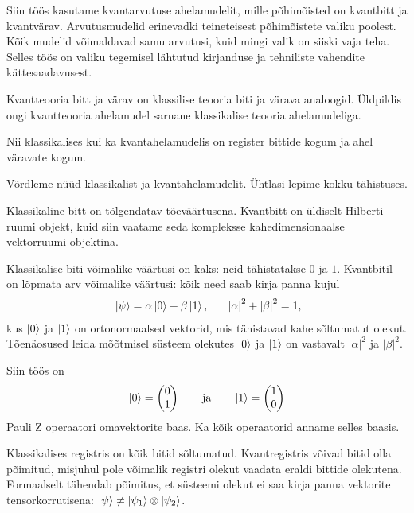 \documentclass[12pt]{report}
\def\abs#1{\left|#1\right|}
\def\ket#1{\mathinner{|#1\rangle}}
\begin{document}
Siin töös kasutame kvantarvutuse ahelamudelit, mille põhimõisted on kvantbitt
ja kvantvärav. Arvutusmudelid erinevadki teineteisest põhimõistete valiku
poolest. Kõik mudelid võimaldavad samu arvutusi, kuid mingi valik on siiski
vaja teha. Selles töös on valiku tegemisel lähtutud kirjanduse ja tehniliste
vahendite kättesaadavusest.

Kvantteooria bitt ja värav on klassilise teooria biti ja värava analoogid.
Üldpildis ongi kvantteooria ahelamudel sarnane klassikalise teooria
ahelamudeliga.

Nii klassikalises kui ka kvantahelamudelis on register bittide kogum ja ahel
väravate kogum.

Võrdleme nüüd klassikalist ja kvantahelamudelit. Ühtlasi lepime kokku
tähistuses.

Klassikaline bitt on tõlgendatav tõeväärtusena. Kvantbitt on üldiselt Hilberti
ruumi objekt, kuid siin vaatame seda kompleksse kahedimensionaalse vektorruumi
objektina.

Klassikalise biti võimalike väärtusi on kaks: neid tähistatakse \(0\) ja \(1\).
Kvantbitil on lõpmata arv võimalike väärtusi: kõik need saab kirja panna kujul
\begin{align}
    \ket{\psi} = \alpha\ket{0} + \beta\ket{1} \rlap{,}
    \qquad \abs{\alpha}^2 + \abs{\beta}^2 = 1 \rlap{,}
\end{align}
kus \(\ket{0}\) ja \(\ket{1}\) on ortonormaalsed vektorid, mis tähistavad kahe
sõltumatut olekut. Tõenäosused leida mõõtmisel süsteem olekutes \(\ket{0}\) ja
\(\ket1\) on vastavalt \(\abs{\alpha}^2\) ja \(\abs{\beta}^2\).

Siin töös on
\begin{align}
    \ket{0} = \begin{pmatrix}
        0 \\
        1 \\
    \end{pmatrix}
    \qquad \text{ja} \qquad
    \ket{1} = \begin{pmatrix}
        1 \\
        0 \\
    \end{pmatrix}
\end{align}
Pauli Z operaatori omavektorite baas. Ka kõik operaatorid anname selles baasis.

Klassikalises registris on kõik bitid sõltumatud. Kvantregistris võivad bitid
olla põimitud, misjuhul pole võimalik registri olekut vaadata eraldi bittide
olekutena. Formaalselt tähendab põimitus, et süsteemi olekut ei saa kirja panna
vektorite tensorkorrutisena: \(\ket{\psi} \ne \ket{\psi_1} \otimes
\ket{\psi_2}\).
\end{document}
